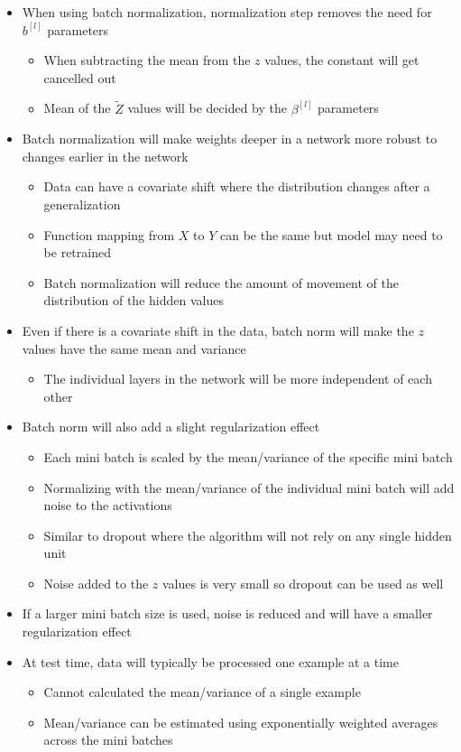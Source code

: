 \documentclass[12pt, letterpaper]{article}
\begin{document}
\begin{itemize}
\begin{itemize}
        \end{itemize}
        \item When using batch normalization, normalization step removes the need for $b^{[l]}$ parameters
        \begin{itemize}
            \item When subtracting the mean from the $z$ values, the constant will get cancelled out
            \item Mean of the $\tilde{Z}$ values will be decided by the $\beta^{[l]}$ parameters 
        \end{itemize}
        \item Batch normalization will make weights deeper in a network more robust to changes earlier in the network
        \begin{itemize}
            \item Data can have a covariate shift where the distribution changes after a generalization 
            \item Function mapping from $X$ to $Y$ can be the same but model may need to be retrained 
            \item Batch normalization will reduce the amount of movement of the distribution of the hidden values
        \end{itemize}
        \item Even if there is a covariate shift in the data, batch norm will make the $z$ values have the same mean and variance
        \begin{itemize}
            \item The individual layers in the network will be more independent of each other 
        \end{itemize}
        \item Batch norm will also add a slight regularization effect
        \begin{itemize}
            \item Each mini batch is scaled by the mean/variance of the specific mini batch
            \item Normalizing with the mean/variance of the individual mini batch will add noise to the activations
            \item Similar to dropout where the algorithm will not rely on any single hidden unit 
            \item Noise added to the $z$ values is very small so dropout can be used as well 
        \end{itemize}
        \item If a larger mini batch size is used, noise is reduced and will have a smaller regularization effect
        \item At test time, data will typically be processed one example at a time 
        \begin{itemize}
            \item Cannot calculated the mean/variance of a single example 
            \item Mean/variance can be estimated using exponentially weighted averages across the mini batches
        \end{itemize}
    \end{itemize}
\end{document}
